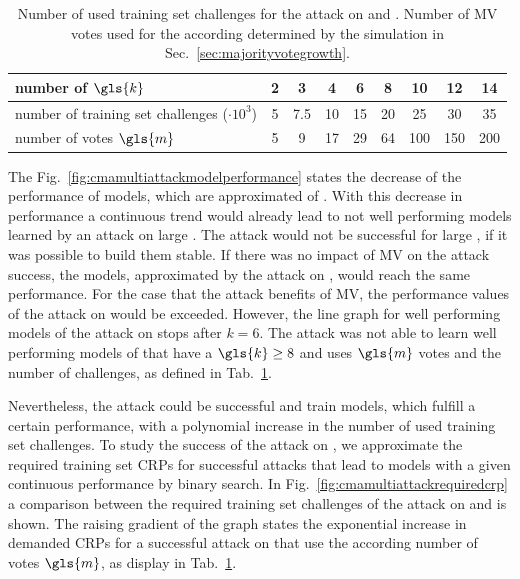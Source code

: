 \begin{table}[ht]
\centering
\begin{tabular}{|l|c|c|c|c|c|c|c|c|}
\hline
number of $\gls{k}$ & 2 & 3 & 4 & 6 & 8 & 10 & 12 & 14\\
\hline
number of training set challenges ($\cdot 10^3$) & 5 & 7.5 & 10 & 15 & 20 & 25 & 30 & 35\\
\hline
number of votes $\gls{m}$ & 5 & 9 & 17 & 29 & 64 & 100 & 150 & 200\\
\hline
\end{tabular}
\caption[Number of votes and challenges used for \acs{CMA-ES} attack]{Number of used training set challenges for the attack on \xpufs and \mxpufs. Number of \ac{MV} votes used for the according \mxpufs determined by the simulation in Sec.\ \ref{sec:majorityvotegrowth}.}
\label{tab:cmamultinumbervotes}
\end{table}

The Fig.\ \ref{fig:cmamultiattackmodelperformance} states the decrease of the performance of models, which are approximated of \xpufs.
With this decrease in performance a continuous trend would already lead to not well performing models learned by an attack on large \xpufs.
The attack would not be successful for large \xpufs, if it was possible to build them stable.
If there was no impact of \ac{MV} on the attack success, the models, approximated by the attack on \mxpufs, would reach the same performance.
For the case that the attack benefits of \ac{MV}, the performance values of the attack on \xpufs would be exceeded.
However, the line graph for well performing models of the attack on \mxpufs stops after $k = 6$.
The attack was not able to learn well performing models of \mxpufs that have a $\gls{k} \ge 8$ and uses $\gls{m}$ votes and the number of challenges, as defined in Tab.\ \ref{tab:cmamultinumbervotes}.

Nevertheless, the attack could be successful and train models, which fulfill a certain performance, with a polynomial increase in the number of used training set challenges.
To study the success of the attack on \mxpufs, we approximate the required training set \acp{CRP} for successful attacks that lead to models with a given continuous performance by binary search.
In Fig.\ \ref{fig:cmamultiattackrequiredcrp} a comparison between the required training set challenges of the attack on \xpufs and \mxpufs is shown.
The raising gradient of the graph states the exponential increase in demanded \acp{CRP} for a successful attack on \mxpufs that use the according number of votes $\gls{m}$, as display in Tab.\ \ref{tab:cmamultinumbervotes}.

